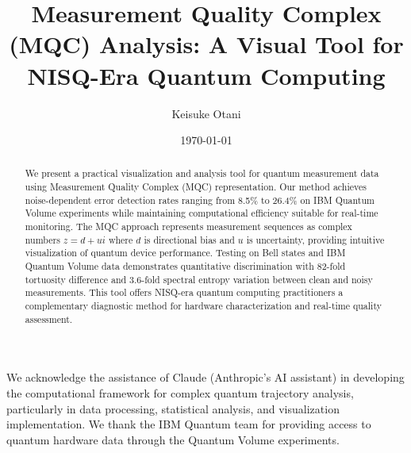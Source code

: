 \documentclass[aps,pra,twocolumn,showpacs,preprintnumbers,amsmath,amssymb]{revtex4-1}
\begin{document}

\title{Measurement Quality Complex (MQC) Analysis: A Visual Tool for NISQ-Era Quantum Computing}

\author{Keisuke Otani}

\date{\today}

\begin{abstract}
We present a practical visualization and analysis tool for quantum measurement data using Measurement Quality Complex (MQC) representation. Our method achieves noise-dependent error detection rates ranging from 8.5\% to 26.4\% on IBM Quantum Volume experiments while maintaining computational efficiency suitable for real-time monitoring. The MQC approach represents measurement sequences as complex numbers $z = d + ui$ where $d$ is directional bias and $u$ is uncertainty, providing intuitive visualization of quantum device performance. Testing on Bell states and IBM Quantum Volume data demonstrates quantitative discrimination with 82-fold tortuosity difference and 3.6-fold spectral entropy variation between clean and noisy measurements. This tool offers NISQ-era quantum computing practitioners a complementary diagnostic method for hardware characterization and real-time quality assessment.
\end{abstract}


\maketitle








\begin{acknowledgments}
We acknowledge the assistance of Claude (Anthropic's AI assistant) in developing the computational framework for complex quantum trajectory analysis, particularly in data processing, statistical analysis, and visualization implementation. We thank the IBM Quantum team for providing access to quantum hardware data through the Quantum Volume experiments.
\end{acknowledgments}



\end{document}
